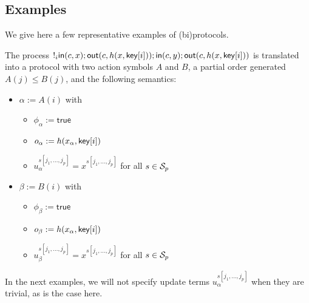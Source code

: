 \subsection{Examples}

We give here a few representative examples of (bi)protocols.

\begin{example}
  The process $!_i
  \mathsf{in}(c,x);\mathsf{out}(c,h(x,\mathsf{key}[i]));\mathsf{in}(c,y);\mathsf{out}(c,h(x,\mathsf{key}[i]))$
  is translated into a protocol with two action symbols $A$ and $B$,
  a partial order generated $A(j) \leq B(j)$, and the following
  semantics:
  \begin{itemize}
    \item $\alpha := A(i)$ with
      \begin{itemize}
        \item $\phi_\alpha := \mathsf{true}$
        \item $o_\alpha := h(x_\alpha,\mathsf{key}[i])$
        \item $u_\alpha^{s[j_1,\ldots,j_p]} = x^{s[j_1,\ldots,j_p]}$
          for all $s\in\mathcal{S}_p$
      \end{itemize}
    \item $\beta := B(i)$ with
      \begin{itemize}
        \item $\phi_\beta := \mathsf{true}$
        \item $o_\beta := h(x_\alpha,\mathsf{key}[i])$
        \item $u_\beta^{s[j_1,\ldots,j_p]} = x^{s[j_1,\ldots,j_p]}$
          for all $s\in\mathcal{S}_p$
      \end{itemize}
  \end{itemize}
  In the next examples, we will not specify update terms
  $u_\alpha^{s[j_1,\ldots,j_p]}$ when they are trivial, as is the case
  here.
\end{example}

